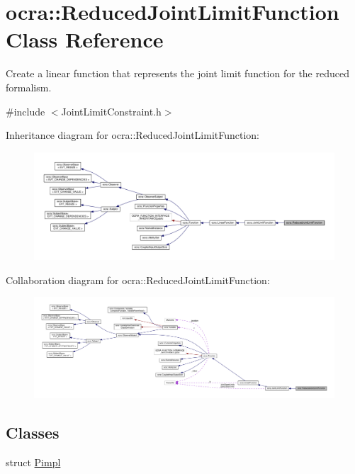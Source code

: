 \hypertarget{classocra_1_1ReducedJointLimitFunction}{}\section{ocra\+:\+:Reduced\+Joint\+Limit\+Function Class Reference}
\label{classocra_1_1ReducedJointLimitFunction}


Create a linear function that represents the joint limit function for the reduced formalism.  




{\ttfamily \#include $<$Joint\+Limit\+Constraint.\+h$>$}



Inheritance diagram for ocra\+:\+:Reduced\+Joint\+Limit\+Function\+:
\nopagebreak
\begin{figure}[H]
\begin{center}
\leavevmode
\includegraphics[width=350pt]{d9/d6d/classocra_1_1ReducedJointLimitFunction__inherit__graph}
\end{center}
\end{figure}


Collaboration diagram for ocra\+:\+:Reduced\+Joint\+Limit\+Function\+:
\nopagebreak
\begin{figure}[H]
\begin{center}
\leavevmode
\includegraphics[width=350pt]{d9/db4/classocra_1_1ReducedJointLimitFunction__coll__graph}
\end{center}
\end{figure}
\subsection*{Classes}
\begin{DoxyCompactItemize}
\item 
struct \hyperlink{structReducedJointLimitFunction_1_1Pimpl}{Pimpl}
\end{DoxyCompactItemize}
